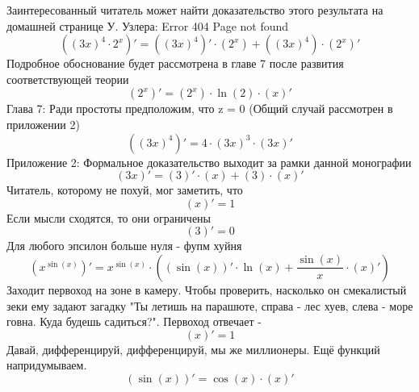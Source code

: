 \documentclass[a4paper,12pt]{article} %
\begin{document}
 \newline 
Заинтересованный читатель может найти доказательство этого результата на домашней странице У. Узлера: Error 404 Page not found\newline $$ \left(  \left(  3 x\right)^{ 4}\cdot   2^{ x} \right)' =  \left( \left(  3 x\right)^{ 4} \right)' \cdot \left(  2^{ x} \right) +  \left( \left(  3 x\right)^{ 4} \right) \cdot \left(  2^{ x} \right)'$$
 \newline 
Подробное обоснование будет рассмотрена в главе 7 после развития соответствующей теории\newline $$ \left(  2^{ x} \right)' =  \left(  2^{ x} \right) \cdot \ln \left( 2\right) \cdot  \left( x \right)'$$
 \newline 
Глава 7: Ради простоты предположим, что z = 0 (Общий случай рассмотрен в приложении 2)\newline $$ \left( \left(  3 x\right)^{ 4} \right)' = 4 \cdot \left(  3 x \right) ^ 3 \cdot  \left(  3 x \right)'$$
 \newline 
Приложение 2: Формальное доказательство выходит за рамки данной монографии\newline $$ \left(  3 x \right)' =  \left( 3 \right)' \cdot \left( x \right) +  \left( 3 \right) \cdot \left( x \right)'$$
 \newline 
Читатель, которому не похуй, мог заметить, что\newline $$ \left( x \right)' = 1$$
 \newline 
Если мысли сходятся, то они ограничены\newline $$ \left( 3 \right)' = 0$$
 \newline 
Для любого эпсилон больше нуля - фупм хуйня\newline $$ \left(  x^{ \sin \left( x\right)} \right)' =   x^{ \sin \left( x\right)} \cdot \left( \left( \sin \left( x\right) \right)' \cdot  \ln \left( x\right) +  \frac{ \sin \left( x\right)}{ x} \cdot \left( x \right)' \right)$$
 \newline 
Заходит первоход на зоне в камеру. Чтобы проверить, насколько он смекалистый зеки ему задают загадку "Ты летишь на парашюте, справа - лес хуев, слева - море говна. Куда будешь садиться?". Первоход отвечает - \newline $$ \left( x \right)' = 1$$
 \newline 
Давай, дифференцируй, дифференцируй, мы же миллионеры. Ещё функций напридумываем.\newline $$ \left( \sin \left( x\right) \right)' =  \cos \left( x\right) \cdot  \left( x \right)'$$
\end{document}
